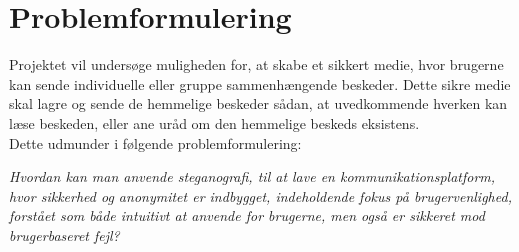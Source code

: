 \section{Problemformulering}
Projektet vil undersøge muligheden for, at skabe et sikkert medie, hvor brugerne kan sende individuelle eller gruppe sammenhængende beskeder. Dette sikre medie skal lagre og sende de hemmelige beskeder sådan, at uvedkommende hverken kan læse beskeden, eller ane uråd om den hemmelige beskeds eksistens. 
\\Dette udmunder i følgende problemformulering:
\begin{mdframed}[linewidth=0pt,backgroundcolor=lightgray!20,innertopmargin = 0.4cm,innerbottommargin = 0.4cm]
    \label{problem_formulering}
    \textit{Hvordan kan man anvende steganografi, til at lave en kommunikationsplatform, hvor sikkerhed og anonymitet er indbygget, indeholdende fokus på brugervenlighed, forstået som både intuitivt at anvende for brugerne, men også er sikkeret mod brugerbaseret fejl?}
\end{mdframed}
